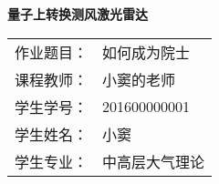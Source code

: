 \begin{center}
	\quad 
	\vspace{5em}
	

	
	\vspace{10em}
	
	\textbf{\heiti \huge 量子上转换测风激光雷达}	
	
	\vspace{20em}
	

	\begin{table}[htbp]  
		\centering     
		\large
		\begin{tabular}{ll}    
			作业题目： & 如何成为院士 \\    
			课程教师：  & 小窦的老师\\    
			学生学号：  &201600000001 \\    
			学生姓名： &  小窦 \\    
			学生专业： & 中高层大气理论 \\    
		\end{tabular}
	\end{table}%
	\vspace{10em}	
	\begin{large}


		
		
	\end{large}
	
\end{center}
